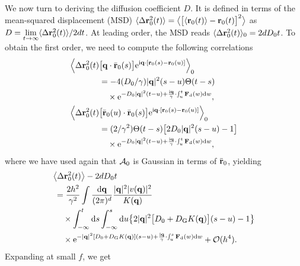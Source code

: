 \documentclass[superscriptaddress, twocolumn, prx, longbibliography, nofootinbib]{revtex4-1}
\begin{document}
We now turn to deriving the diffusion coefficient $D$. It is defined in terms of the mean-squared displacement (MSD) $\langle\Delta{\bf r}_0^2(t)\rangle=\big\langle\big[\langle{\bf r}_0(t)\rangle - {\bf r}_0(t)\big]^2\big\rangle$ as $D=\underset{t\to\infty}{\lim}\langle\Delta{\bf r}_0^2(t)\rangle / 2 d t$. At leading order, the MSD reads $\langle\Delta{\bf r}_0^2(t)\rangle_0 = 2dD_0t$. To obtain the first order, we need to compute the following correlations
\begin{equation}
	\begin{aligned}
		\Big\langle\Delta{\bf r}^2_0(t)& \big[{\bf q}\cdot\bar{\bf r}_0(s)\big] {\rm e}^{{\rm i}{\bf q}\cdot[{\bf r}_0(s)-{\bf r}_0(u)]}\Big\rangle_0
		\\
		&= - 4 (D_0/\gamma)|{\bf q}|^2(s-u) \Theta(t-s)
		\\
		&\quad\times{\rm e}^{ - D_0|{\bf q}|^2(t-u) + \frac{{\rm i}{\bf q}}{\gamma}\cdot\int_u^t {\bf F}_{\rm d}(w) {\rm d}w},
		\\
		\Big\langle\Delta{\bf r}^2_0(t)& \big[\bar{\bf r}_0(u)\cdot\bar{\bf r}_0(s)\big] {\rm e}^{{\rm i}{\bf q}\cdot[{\bf r}_0(s)-{\bf r}_0(u)]}\Big\rangle_0
		\\
		&= (2/\gamma^2)\Theta(t-s) \big[2D_0|{\bf q}|^2(s-u)-1\big]
		\\
		&\quad\times{\rm e}^{ - D_0|{\bf q}|^2(t-u) + \frac{{\rm i}{\bf q}}{\gamma}\cdot\int_u^t {\bf F}_{\rm d}(w) {\rm d}w} ,
	\end{aligned}
\end{equation}
where we have used again that ${\cal A}_0$ is Gaussian in terms of $\bar{\bf r}_0$, yielding
\begin{equation}
	\begin{aligned}
		&\big\langle\Delta{\bf r}^2_0(t)\big\rangle - 2 d D_0 t
		\\
		&\,= \frac{2h^2}{\gamma^2} \int \frac{{\rm d}{\bf q}}{(2\pi)^d} \frac{|{\bf q}|^2 |v({\bf q})|^2}{K({\bf q})}
		\\
		&\,\quad\times \int_{-\infty}^t{\rm d}s \int_{-\infty}^s{\rm d}u \big\{ 2|{\bf q}|^2\big[D_0+D_{\rm G}K({\bf q})\big](s-u) - 1\big\}
		\\
		&\,\quad\times {\rm e}^{ -|{\bf q}|^2[D_0+D_{\rm G}K({\bf q})](s-u) + \frac{{\rm i}{\bf q}}{\gamma}\cdot\int_u^s{\bf F}_{\rm d}(w) {\rm d}w } + {\cal O}(h^4) .
	\end{aligned}
\end{equation}
Expanding at small $f$, we get
\end{document}
